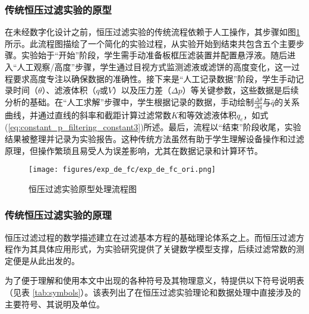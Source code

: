 \documentclass[UTF8,a4paper,fontset=none]{ctexart}
\begin{document}
\subsubsection{传统恒压过滤实验的原型}

在未经数字化设计之前，恒压过滤实验的传统流程依赖于人工操作，其步骤如图\ref{fig:exp_de_fc_ori}所示。此流程图描绘了一个简化的实验过程，从实验开始到结束共包含五个主要步骤。实验始于“开始”阶段，学生需手动准备板框压滤装置并配置悬浮液。随后进入“人工观察/高度”步骤，学生通过目视方式监测滤液或滤饼的高度变化，这一过程要求高度专注以确保数据的准确性。接下来是“人工记录数据”阶段，学生手动记录时间（\(\theta\)）、滤液体积（\(q\)或\(V\)）以及压力差（\(\Delta p\)）等关键参数，这些数据是后续分析的基础。在“人工求解”步骤中，学生根据记录的数据，手动绘制\(\frac{\Delta \theta}{\Delta q}\)与\(\bar{q}\)的关系曲线，并通过直线的斜率和截距计算过滤常数\(K\)和等效滤液体积\(q_e\)，如式(\ref{eq:constant_p_filtering_constant3})所述。最后，流程以“结束”阶段收尾，实验结果被整理并记录为实验报告。这种传统方法虽然有助于学生理解设备操作和过滤原理，但操作繁琐且易受人为误差影响，尤其在数据记录和计算环节。

\begin{figure}[H]
    \centering
    \texttt{[image: figures/exp\_de\_fc/exp\_de\_fc\_ori.png]}
    \caption{恒压过滤实验原型处理流程图}
    \label{fig:exp_de_fc_ori}
\end{figure}

\subsubsection{传统恒压过滤实验的原理}


恒压过滤过程的数学描述建立在过滤基本方程的基础理论体系之上。而恒压过滤方程作为其具体应用形式，为实验研究提供了关键数学模型支撑，后续过滤常数的测定便是从此出发的。

为了便于理解和使用本文中出现的各种符号及其物理意义，特提供以下符号说明表（见表 \ref{tab:symbols}）。该表列出了在恒压过滤实验理论和数据处理中直接涉及的主要符号、其说明及单位。
\end{document}
